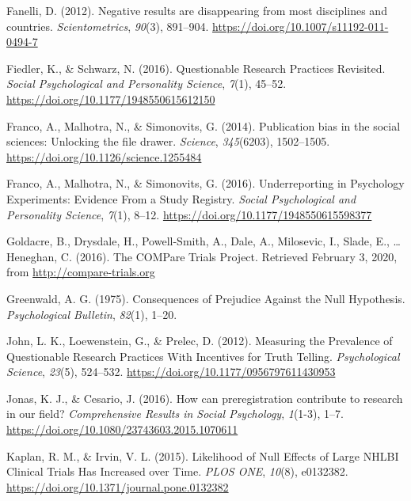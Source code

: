 \documentclass[british,,jou,floatsintext]{apa6}
\begin{document}
\leavevmode\hypertarget{ref-Fanelli2012}{}%
Fanelli, D. (2012). Negative results are disappearing from most disciplines and countries. \emph{Scientometrics}, \emph{90}(3), 891--904. \url{https://doi.org/10.1007/s11192-011-0494-7}

\leavevmode\hypertarget{ref-Fiedler2016}{}%
Fiedler, K., \& Schwarz, N. (2016). Questionable Research Practices Revisited. \emph{Social Psychological and Personality Science}, \emph{7}(1), 45--52. \url{https://doi.org/10.1177/1948550615612150}

\leavevmode\hypertarget{ref-Franco2014}{}%
Franco, A., Malhotra, N., \& Simonovits, G. (2014). Publication bias in the social sciences: Unlocking the file drawer. \emph{Science}, \emph{345}(6203), 1502--1505. \url{https://doi.org/10.1126/science.1255484}

\leavevmode\hypertarget{ref-Franco2016}{}%
Franco, A., Malhotra, N., \& Simonovits, G. (2016). Underreporting in Psychology Experiments: Evidence From a Study Registry. \emph{Social Psychological and Personality Science}, \emph{7}(1), 8--12. \url{https://doi.org/10.1177/1948550615598377}

\leavevmode\hypertarget{ref-Goldacre2016}{}%
Goldacre, B., Drysdale, H., Powell-Smith, A., Dale, A., Milosevic, I., Slade, E., \ldots{} Heneghan, C. (2016). The COMPare Trials Project. Retrieved February 3, 2020, from \url{http://compare-trials.org}

\leavevmode\hypertarget{ref-Greenwald1975}{}%
Greenwald, A. G. (1975). Consequences of Prejudice Against the Null Hypothesis. \emph{Psychological Bulletin}, \emph{82}(1), 1--20.

\leavevmode\hypertarget{ref-John2012}{}%
John, L. K., Loewenstein, G., \& Prelec, D. (2012). Measuring the Prevalence of Questionable Research Practices With Incentives for Truth Telling. \emph{Psychological Science}, \emph{23}(5), 524--532. \url{https://doi.org/10.1177/0956797611430953}

\leavevmode\hypertarget{ref-Jonas2016}{}%
Jonas, K. J., \& Cesario, J. (2016). How can preregistration contribute to research in our field? \emph{Comprehensive Results in Social Psychology}, \emph{1}(1-3), 1--7. \url{https://doi.org/10.1080/23743603.2015.1070611}

\leavevmode\hypertarget{ref-Kaplan2015}{}%
Kaplan, R. M., \& Irvin, V. L. (2015). Likelihood of Null Effects of Large NHLBI Clinical Trials Has Increased over Time. \emph{PLOS ONE}, \emph{10}(8), e0132382. \url{https://doi.org/10.1371/journal.pone.0132382}
\end{document}
